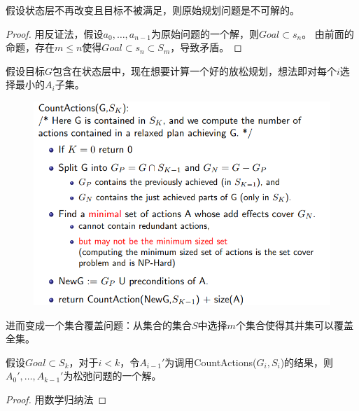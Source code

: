 \begin{theorem}
假设状态层不再改变且目标不被满足，则原始规划问题是不可解的。
\end{theorem}
\begin{proof}
用反证法，假设$a_0,\ldots,a_{n-1}$为原始问题的一个解，则$Goal\subset s_n$。
由前面的命题，存在$m\leq n$使得$Goal\subset s_n\subset S_m$，导致矛盾。
\end{proof}

假设目标$G$包含在状态层中，现在想要计算一个好的放松规划，想法即对每个$i$选择最小的$A_i$子集。
\begin{figure}[H]
\centering
\includegraphics[width=0.8\linewidth]{fig/count_actions.png}
\end{figure}
进而变成一个集合覆盖问题：从集合的集合$S$中选择$m$个集合使得其并集可以覆盖全集。

\begin{theorem}
假设$Goal\subset S_k$，对于$i<k$，令$A_{i-1}'$为调用CountActions($G_i,S_i$)的结果，则$A_0',\ldots,A_{k-1}'$为松弛问题的一个解。
\end{theorem}
\begin{proof}
用数学归纳法
\end{proof}